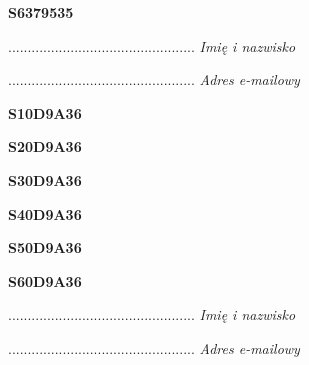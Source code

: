 \begin{turn}{90}\huge \textbf{S6379535}\end{turn}

\begin{turn}{90}\begin{minipage}{\linewidth} \vspace{20mm} ................................................  \textit{Imię i nazwisko}\end{minipage}\end{turn}

\begin{turn}{90}\begin{minipage}{\linewidth} \vspace{20mm} ................................................  \textit{Adres e-mailowy}\end{minipage}\end{turn}

\begin{turn}{90}\huge \textbf{S10D9A36}\end{turn}

\begin{turn}{90}\huge \textbf{S20D9A36}\end{turn}

\begin{turn}{90}\huge \textbf{S30D9A36}\end{turn}

\begin{turn}{90}\huge \textbf{S40D9A36}\end{turn}

\begin{turn}{90}\huge \textbf{S50D9A36}\end{turn}

\begin{turn}{90}\huge \textbf{S60D9A36}\end{turn}

\begin{turn}{90}\begin{minipage}{\linewidth} \vspace{20mm} ................................................  \textit{Imię i nazwisko}\end{minipage}\end{turn}

\begin{turn}{90}\begin{minipage}{\linewidth} \vspace{20mm} ................................................  \textit{Adres e-mailowy}\end{minipage}\end{turn}

